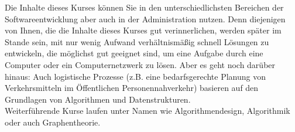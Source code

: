 Die Inhalte dieses Kurses können Sie in den unterschiedlichsten Bereichen der Softwareentwicklung aber auch in der Administration nutzen. Denn diejenigen von Ihnen, die die Inhalte dieses Kurses gut verinnerlichen, werden später im Stande sein, mit nur wenig Aufwand verhältnismäßig schnell Lösungen zu entwickeln, die möglichst gut geeignet sind, um eine Aufgabe durch eine Computer oder ein Computernetzwerk zu lösen. Aber es geht noch darüber hinaus: Auch logistische Prozesse (z.B. eine bedarfsgerechte Planung von Verkehrsmitteln im Öffentlichen Personennahverkehr) basieren auf den Grundlagen von Algorithmen und Datenstrukturen.\\

Weiterführende Kurse laufen unter Namen wie Algorithmendesign, Algorithmik oder auch Graphentheorie.